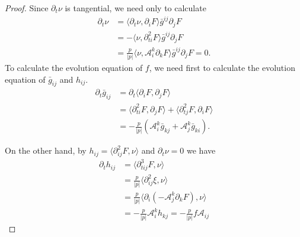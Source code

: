 \documentclass{amsart}
\theoremstyle{definition}
\theoremstyle{remark}
\numberwithin{equation}{section}
\begin{document}
\begin{proof}
Since $\partial_t \nu$ is tangential, we need only to calculate
\begin{align*}
\partial_t\nu&=\langle \partial_t\nu,\partial_iF\rangle \bar{g}^{ij}\partial_jF\\
&=-\langle \nu,\partial^2_{ti}F\rangle \bar{g}^{ij}\partial_jF\\
&=\frac{p}{|p|}\langle \nu,\mathcal{A}_i^k\partial_kF\rangle \bar{g}^{ij}\partial_jF=0.
\end{align*}
To calculate the evolution equation of $ f $, we need first to calculate the evolution equation of $\bar{g}_{ij}$ and $h_{ij}.$
\begin{align*}
\partial_t \bar{g}_{ij}&=\partial_t \langle \partial_iF,\partial_jF\rangle\\
&=\langle \partial_{ti}^2F,\partial_jF\rangle+\langle \partial_{tj}^2F,\partial_iF\rangle\\
&=-\frac{p}{|p|}(\mathcal{A}_{i}^k\bar{g}_{kj}+\mathcal{A}_{j}^k\bar{g}_{ki}).
\end{align*}

On the other hand, by $h_{ij}=\langle \partial_{ij}^2F, \nu\rangle$ and $\partial_t\nu=0$ we have
\begin{align*}
\partial_t h_{ij}&=\langle\partial^3_{tij}F,\nu\rangle\\
&=\frac{p}{|p|}\langle\partial^2_{ij}\xi,\nu\rangle\\
&=\frac{p}{|p|}\langle \partial_i(-\mathcal{A}_j^k\partial_kF),\nu\rangle\\
&=-\frac{p}{|p|}\mathcal{A}_i^kh_{kj}=-\frac{p}{|p|} f  \mathcal{A}_{ij}\end{align*}


\end{proof}
\end{document}
